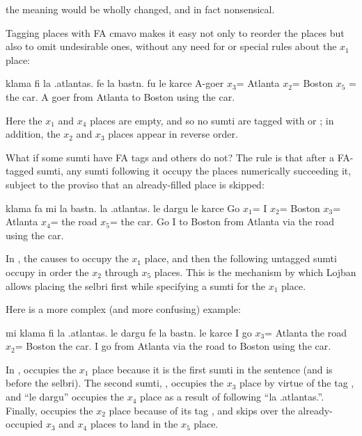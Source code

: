 {\noindent}the meaning would be wholly changed, and in fact nonsensical. 

Tagging places with FA cmavo makes it easy not only to
    reorder the places but also to omit undesirable ones, without
    any need for  or special rules about the $x_1$ place:
\begin{example}
klama fi la .atlantas. fe la bastn. fu le karce\n
A-goer $x_3$= Atlanta $x_2$= Boston $x_5$ = the car.\n
A goer from Atlanta to Boston using the car.
\end{example}

Here the $x_1$ and $x_4$ places are empty, and so no sumti are
    tagged with  or ; in addition, the $x_2$ and $x_3$ places
    appear in reverse order.

What if some sumti have FA tags and others do not? The rule
    is that after a FA-tagged sumti, any sumti following it occupy
    the places numerically succeeding it, subject to the proviso
    that an already-filled place is skipped:
\begin{example}
klama fa mi la bastn. la .atlantas.\n
\T	le dargu le karce\n
Go $x_1$= I $x_2$= Boston $x_3$= Atlanta\n
\T	$x_4$= the road $x_5$= the car.\n
Go I to Boston from Atlanta via the road\n
\T	using the car.
\end{example}

In , the  causes 
    to occupy the $x_1$ place, and then the following untagged sumti
    occupy in order the $x_2$ through $x_5$ places. This is the mechanism
    by which Lojban allows placing the selbri first while
    specifying a sumti for the $x_1$ place.

Here is a more complex (and more confusing) example:
\begin{example}
mi klama fi la .atlantas. le dargu\n
\T	fe la bastn. le karce\n
I go $x_3$= Atlanta the road\n
\T	$x_2$= Boston the car.\n
I go from Atlanta via the road to Boston using the car.
\end{example}

In ,  occupies the $x_1$
    place because it is the first sumti in the sentence (and is
    before the selbri). The second sumti, ,
    occupies the $x_3$ place by virtue of the tag , and ``le
    dargu'' occupies the $x_4$ place as a result of following ``la
    .atlantas.''. Finally,  occupies the $x_2$ place
    because of its tag , and  skips over the
    already-occupied $x_3$ and $x_4$ places to land in the $x_5$ place.

